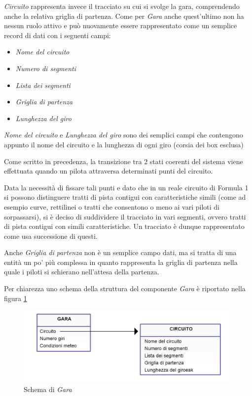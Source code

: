 \documentclass[a4paper,11pt, twoside]{book}
\begin{document}
      \textsl{Circuito} rappresenta invece il tracciato su cui si svolge la gara, comprendendo anche
      la relativa griglia di partenza.
      Come per \textsl{Gara} anche quest'ultimo non ha nessun ruolo attivo e può nuovamente
      essere rappresentato come un semplice record di dati con i seguenti campi:      
      
      \begin{itemize}
	\item \textsl{Nome del circuito}
	\item \textsl{Numero di segmenti}
	\item \textsl{Lista dei segmenti}
	\item \textsl{Griglia di partenza}
	\item \textsl{Lunghezza del giro}
      \end{itemize}
      
      \textsl{Nome del circuito} e \textsl{Lunghezza del giro} sono dei semplici campi che contengono appunto
      il nome del circuito e la lunghezza di ogni giro (corsia dei box esclusa)
      
      Come scritto in precedenza, la transizione tra 2 stati coerenti del sistema viene effettuata quando 
      un pilota attraversa determinati punti del circuito.
      
      Data la necessità di fissare tali punti
      e dato che in un reale circuito 
      di Formula 1 si possono distinguere tratti di pista contigui con caratteristiche simili
      (come ad esempio curve, rettilinei o
      tratti che consentono o meno ai vari piloti di sorpassarsi), si è deciso
      di suddividere il tracciato in vari segmenti, ovvero tratti di pista contigui con simili caratteristiche.
      Un tracciato è dunque rappresentato come usa successione di questi.
      
      Anche \textsl{Griglia di partenza} non è un semplice campo dati, ma si tratta di una entità un po' più complessa
      in quanto rappresenta la griglia di partenza nella quale i piloti si schierano nell'attesa della partenza.
      
      Per chiarezza uno schema della struttura del componente \textsl{Gara} è riportato nella figura \ref{Fig:SchemaGara}
      
      \begin{figure}[ht]
	\centering
	\includegraphics[width=110mm]{./Immagini/SchemaGara.png}
	\caption{Schema di \textsl{Gara}}
	\label{Fig:SchemaGara}
      \end{figure}
      
\end{document}
